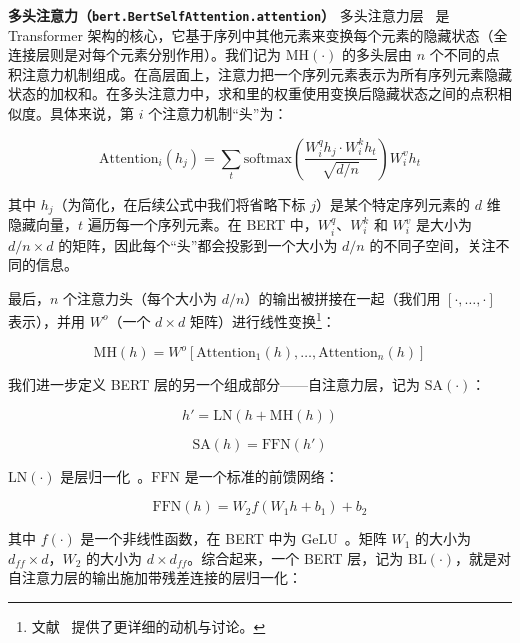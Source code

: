 \documentclass[11pt]{article}
\begin{document}
\textbf{多头注意力（\texttt{bert.BertSelfAttention.attention}）} 多头注意力层~\cite{vaswani2017attention} 是 Transformer 架构的核心，它基于序列中其他元素来变换每个元素的隐藏状态（全连接层则是对每个元素分别作用）。我们记为 $\mathrm{MH}(\cdot)$ 的多头层由 $n$ 个不同的点积注意力机制组成。在高层面上，注意力把一个序列元素表示为所有序列元素隐藏状态的加权和。在多头注意力中，求和里的权重使用变换后隐藏状态之间的点积相似度。具体来说，第 $i$ 个注意力机制``头''为：

\begin{equation}
\mathrm{Attention}_i(h_j) = \sum_t \mathrm{softmax}\left(\frac{W_i^q h_j \cdot W_i^k h_t}{\sqrt{d/n}}\right) W_i^v h_t
\end{equation}

其中 $h_j$（为简化，在后续公式中我们将省略下标 $j$）是某个特定序列元素的 $d$ 维隐藏向量，$t$ 遍历每一个序列元素。在 BERT 中，$W_i^q$、$W_i^k$ 和 $W_i^v$ 是大小为 $d/n \times d$ 的矩阵，因此每个``头''都会投影到一个大小为 $d/n$ 的不同子空间，关注不同的信息。

最后，$n$ 个注意力头（每个大小为 $d/n$）的输出被拼接在一起（我们用 $[\cdot, \dots, \cdot]$ 表示），并用 $W^o$（一个 $d \times d$ 矩阵）进行线性变换\footnote{文献~\cite{vaswani2017attention} 提供了更详细的动机与讨论。}：

\begin{equation}
\mathrm{MH}(h) = W^o [\mathrm{Attention}_1(h), \dots, \mathrm{Attention}_n(h)]
\end{equation}

我们进一步定义 BERT 层的另一个组成部分——自注意力层，记为 $\mathrm{SA}(\cdot)$：

\begin{equation}
h' = \mathrm{LN}(h + \mathrm{MH}(h))
\end{equation}

\begin{equation}
\mathrm{SA}(h) = \mathrm{FFN}(h')
\end{equation}

$\mathrm{LN}(\cdot)$ 是层归一化~\cite{ba2016layer}。$\mathrm{FFN}$ 是一个标准的前馈网络：

\begin{equation}
\mathrm{FFN}(h) = W_2 f(W_1 h + b_1) + b_2
\end{equation}

其中 $f(\cdot)$ 是一个非线性函数，在 BERT 中为 GeLU~\cite{hendrycks2016gaussian}。矩阵 $W_1$ 的大小为 $d_{ff} \times d$，$W_2$ 的大小为 $d \times d_{ff}$。综合起来，一个 BERT 层，记为 $\mathrm{BL}(\cdot)$，就是对自注意力层的输出施加带残差连接的层归一化：
\end{document}
